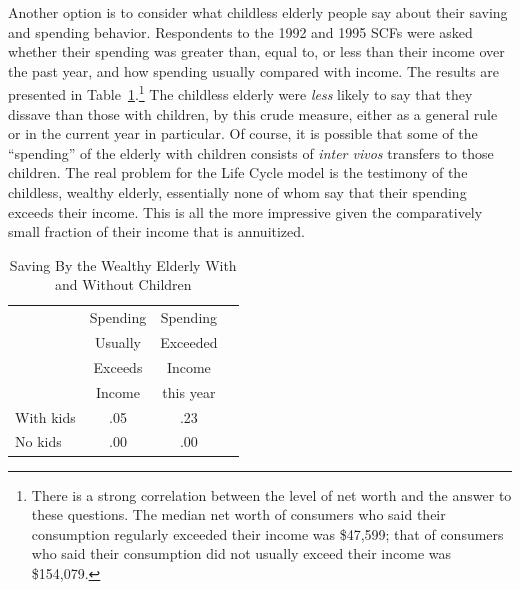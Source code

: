 \documentclass[titlepage,12pt]{article}
\begin{document}
Another option is to consider what childless elderly people 
say about their saving and spending behavior.  Respondents to the 1992 
and 1995 SCFs were asked whether their spending was greater than, 
equal to, or less than their income over the past year, and how 
spending usually compared with income.  The results are presented in 
Table~\ref{table:SavOfRichOldByKidStatus}.\footnote{There is a strong 
correlation between the level of net worth and the answer to these 
questions.  The median net worth of consumers who said their 
consumption regularly exceeded their income was \$47,599; that of 
consumers who said their consumption did not usually exceed their 
income was \$154,079.} The childless elderly were {\it less} likely to 
say that they dissave than those with children, by this crude measure, 
either as a general rule or in the current year in particular.  Of 
course, it is possible that some of the ``spending'' of the elderly 
with children consists of {\it inter vivos} transfers to those 
children.  The real problem for the Life Cycle model is the testimony 
of the childless, wealthy elderly, essentially none of whom say that 
their spending exceeds their income.  This is all the more impressive 
given the comparatively small fraction of their income that is 
annuitized.
\hypertarget{saving-by-the-wealthy-elderly-with-and-without-children}{}
\begin{table}[tbp]
\center
\begin{tabular}[c]{lccc}
          & Spending  & Spending  \\ 
  	      &  Usually   & Exceeded  \\
   	      &  Exceeds   & Income    \\
   	      &  Income    & this year \\ \hline
With kids &  .05    & .23       \\ 
No kids   &  .00    & .00       \\ \hline
\end{tabular}
	\caption{Saving By the Wealthy Elderly With and Without Children}
	\protect\label{table:SavOfRichOldByKidStatus}
\end{table}
\end{document}
